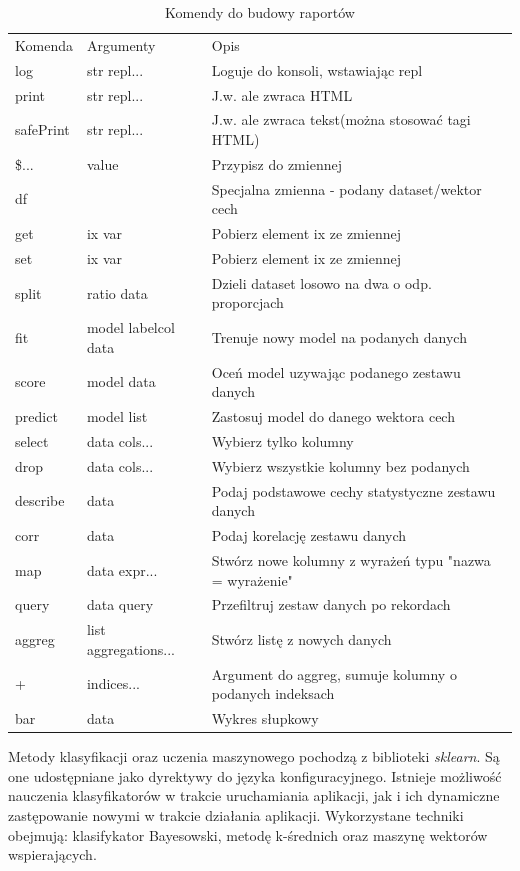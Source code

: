 \documentclass[12pt,a4paper,oneside]{report} %
\begin{document}
\begin{table}
\begin{tabular}{l|l|l}
\hline
Komenda & Argumenty & Opis \\
log            & str  repl... & Loguje do konsoli, wstawiając repl \\
print          & str  repl... & J.w. ale zwraca HTML \\
safePrint      & str  repl... & J.w. ale zwraca tekst(można stosować tagi HTML)\\
\$...          & value & Przypisz do zmiennej\\
df             & & Specjalna zmienna - podany dataset/wektor cech\\
get            & ix var & Pobierz element ix ze zmiennej\\
set            & ix var & Pobierz element ix ze zmiennej \\
split          & ratio   data & Dzieli dataset losowo na dwa o odp. proporcjach \\
fit            & model   labelcol     data & Trenuje nowy model na podanych danych \\
score          & model   data & Oceń model uzywając podanego zestawu danych\\
predict        & model   list & Zastosuj model do danego wektora cech\\
select         & data cols... & Wybierz tylko kolumny\\
drop           & data cols... & Wybierz wszystkie kolumny bez podanych\\
describe       & data & Podaj podstawowe cechy statystyczne zestawu danych\\
corr           & data & Podaj korelację zestawu danych\\
map            & data expr... & Stwórz nowe kolumny z wyrażeń typu "nazwa = wyrażenie"\\
query          & data query & Przefiltruj zestaw danych po rekordach\\
aggreg         & list aggregations... & Stwórz listę z nowych danych\\
+              & indices... & Argument do aggreg, sumuje kolumny o podanych indeksach\\
bar            & data & Wykres słupkowy \\
\hline
\end{tabular}
\caption{Komendy do budowy raportów}
\label{lang}
\end{table}

Metody klasyfikacji oraz uczenia maszynowego pochodzą z biblioteki \emph{sklearn}. Są one udostępniane jako dyrektywy do języka konfiguracyjnego. Istnieje możliwość nauczenia klasyfikatorów w trakcie uruchamiania aplikacji, jak i ich dynamiczne zastępowanie nowymi w trakcie działania aplikacji. Wykorzystane techniki obejmują: klasifykator Bayesowski, metodę k-średnich oraz maszynę wektorów wspierających.\par
\end{document}
